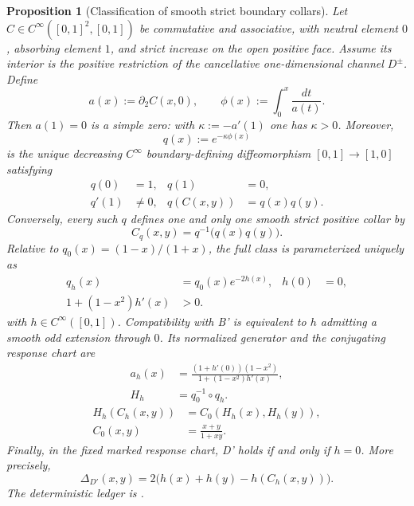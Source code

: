 \documentclass[aps,prd,twocolumn,superscriptaddress,nofootinbib]{revtex4-2}
\newtheorem{proposition}{Proposition}
\begin{document}
\begin{proposition}[Classification of smooth strict boundary collars]
\label{prop:smooth_collar_classification}
Let $C\in C^\infty([0,1]^2,[0,1])$ be commutative and associative, with neutral element $0$, absorbing element $1$, and strict increase on the open positive face. Assume its interior is the positive restriction of the cancellative one-dimensional channel $D^\pm$. Define
\[
 a(x):=\partial_2C(x,0),
 \qquad
 \phi(x):=\int_0^x\frac{dt}{a(t)}.
\]
Then $a(1)=0$ is a simple zero: with $\kappa:=-a'(1)$ one has $\kappa>0$. Moreover,
\[
 q(x):=e^{-\kappa\phi(x)}
\]
is the unique decreasing $C^\infty$ boundary-defining diffeomorphism $[0,1]\to[1,0]$ satisfying
\[
 \begin{aligned}
 q(0)&=1, & q(1)&=0,\\
 q'(1)&\neq0, & q(C(x,y))&=q(x)q(y).
 \end{aligned}
\]
Conversely, every such $q$ defines one and only one smooth strict positive collar by
\[
 C_q(x,y)=q^{-1}\!\bigl(q(x)q(y)\bigr).
\]
Relative to $q_0(x)=(1-x)/(1+x)$, the full class is parameterized uniquely as
\[
 \begin{aligned}
 q_h(x)&=q_0(x)e^{-2h(x)}, & h(0)&=0,\\
 1+(1-x^2)h'(x)&>0.&&
 \end{aligned}
\]
with $h\in C^\infty([0,1])$. Compatibility with B' is equivalent to $h$ admitting a smooth odd extension through $0$. Its normalized generator and the conjugating response chart are
\[
 \begin{aligned}
 a_h(x)&=
 \frac{(1+h'(0))(1-x^2)}{1+(1-x^2)h'(x)},\\
 H_h&=q_0^{-1}\circ q_h.
 \end{aligned}
\]
\[
 \begin{aligned}
 H_h(C_h(x,y))
 &=C_0(H_h(x),H_h(y)),\\
 C_0(x,y)&=\frac{x+y}{1+xy}.
 \end{aligned}
\]
Finally, in the fixed marked response chart, D' holds if and only if $h=0$. More precisely,
\[
 \Delta_{D'}(x,y)
 =2\bigl(h(x)+h(y)-h(C_h(x,y))\bigr).
\]
The deterministic ledger is
.
\end{proposition}
\end{document}
